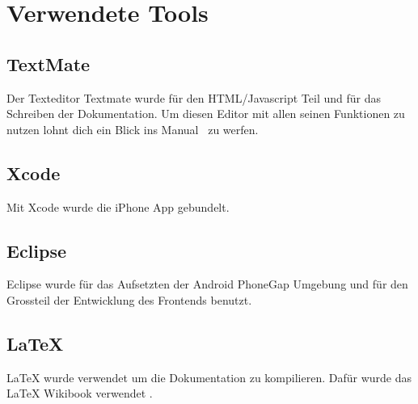 
\newpage
\section{Verwendete Tools} %
\label{sec:Verwendete Tools}

\subsection{TextMate} %
\label{sub:TextMate}
Der Texteditor Textmate wurde für den HTML/Javascript Teil und für das Schreiben der Dokumentation. Um diesen Editor mit allen seinen Funktionen zu nutzen lohnt dich ein Blick ins Manual~\cite{bib:textmate} zu werfen.

\subsection{Xcode} %
\label{ssub:Xcode}
Mit Xcode wurde die iPhone App gebundelt.

\subsection{Eclipse} %
\label{sub:eclispe}
Eclipse wurde für das Aufsetzten der Android PhoneGap Umgebung und für den Grossteil der Entwicklung des Frontends benutzt.

\subsection{LaTeX} %
\label{sub:LaTeX}
LaTeX wurde verwendet um die Dokumentation zu kompilieren. Dafür wurde das LaTeX Wikibook verwendet \cite{bib:latex}.
